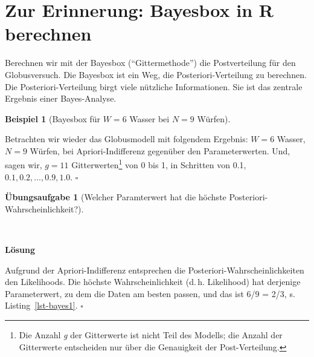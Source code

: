 \documentclass[
  ngerman,
  letterpaper,
  twoside,
  open=any]{scrbook}
\theoremstyle{definition}
\newtheorem{example}{Beispiel}[chapter]
\theoremstyle{plain}
\theoremstyle{definition}
\newtheorem{exercise}{Übungsaufgabe}[chapter]
\theoremstyle{definition}
\theoremstyle{definition}
\newtheorem{example}{Beispiel}[chapter]
\theoremstyle{definition}
\newtheorem{exercise}{Übungsaufgabe}[chapter]
\theoremstyle{remark}
\begin{document}
\section{Zur Erinnerung: Bayesbox in R
berechnen}\label{zur-erinnerung-bayesbox-in-r-berechnen}

Berechnen wir mit der Bayesbox (\enquote{Gittermethode}) die
Postverteilung für den Globusversuch. Die Bayesbox ist ein Weg, die
Posteriori-Verteilung zu berechnen. Die Posteriori-Verteilung birgt
viele nützliche Informationen. Sie ist das zentrale Ergebnis einer
Bayes-Analyse.

\begin{example}[Bayesbox für \(W=6\) Wasser bei \(N=9\)
Würfen]\protect\hypertarget{exm-globus69}{}\label{exm-globus69}

Betrachten wir wieder das Globusmodell mit folgendem Ergebnis: \(W=6\)
Wasser, \(N=9\) Würfen, bei Apriori-Indifferenz gegenüber den
Parameterwerten. Und, sagen wir, \(g=11\) Gitterwerten\footnote{Die
  Anzahl \emph{g} der Gitterwerte ist nicht Teil des Modells; die Anzahl
  der Gitterwerte entscheiden nur über die Genauigkeit der
  Post-Verteilung.} von 0 bis 1, in Schritten von 0.1,
\(0.1, 0.2, \ldots, 0.9, 1.0\). \(\square\)

\end{example}

\begin{exercise}[Welcher Paramterwert hat die höchste
Posteriori-Wahrscheinlichkeit?]\protect\hypertarget{exr-globe69}{}\label{exr-globe69}

~

\begin{tcolorbox}[enhanced jigsaw, arc=.35mm, bottomrule=.15mm, breakable, colback=white, colframe=quarto-callout-tip-color-frame, left=2mm, leftrule=.75mm, opacityback=0, rightrule=.15mm, toprule=.15mm]

\vspace{-3mm}\textbf{Lösung}\vspace{3mm}

Aufgrund der Apriori-Indifferenz entsprechen die
Posteriori-Wahrscheinlichkeiten den Likelihoods. Die höchste
Wahrscheinlichkeit (d.\,h. Likelihood) hat derjenige Parameterwert, zu
dem die Daten am besten passen, und das ist 6/9 = 2/3, s.
Listing~\ref{lst-bayes1}. \(\square\)

\end{tcolorbox}

\end{exercise}
\end{document}
